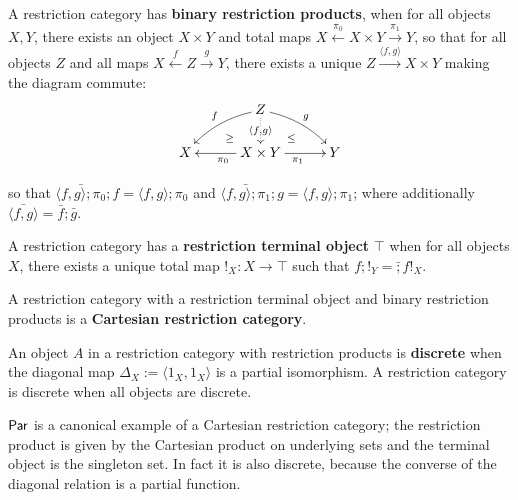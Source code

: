 \begin{definition}
A restriction category has {\bf binary restriction products}, when for all objects  $X,Y$, there exists an object $X\times Y$ and total maps $X \xleftarrow{\pi_0}  X\times Y \xrightarrow{\pi_1} Y$, so that for all objects $Z$ and all maps $X \xleftarrow{f} Z \xrightarrow{g} Y$, there exists a unique $Z\xrightarrow{\langle f,g \rangle} X\times Y$ making the diagram commute:
$$
\xymatrixrowsep{0.2cm}
\xymatrixcolsep{0.4cm}
\xymatrix{
&& Z\ar@{..>}[dd]|-{\langle f, g\rangle} \ar@/_/[ddll]_f \ar@/^/[ddrr]^g &&\\
& \ar@{}[dr]|-{\geq} && \ar@{}[dl] |-{\leq} &\\
X &&  X\times Y \ar[rr]_{\pi_1} \ar[ll]^{\pi_0}  && Y
}
$$

so that $\bar{\langle f, g\rangle ;\pi_0}; f = \langle f, g\rangle ;\pi_0$ and $\bar{\langle f, g\rangle; \pi_1} ;g = \langle f, g\rangle; \pi_1$;
where additionally $\bar{\langle f, g\rangle} =  \bar f ; \bar g$.


A restriction category has a {\bf restriction terminal object} $\top$ when for all objects $X$, there exists a unique total map $!_X:X\to\top$ such that $f ; !_Y = \bar ;  f !_X$.

A restriction category with a restriction terminal object and binary restriction products is a {\bf Cartesian restriction category}.


An object $A$ in a restriction category with restriction products is {\bf discrete} when the diagonal map $\Delta_X:=\langle 1_X, 1_X\rangle$ is a partial isomorphism. A restriction category is discrete when all objects are discrete. 
\end{definition}



$\mathsf{Par}$ is a canonical example of a Cartesian restriction category; the restriction product is given by the Cartesian product on underlying sets and the terminal object is  the singleton set. In fact it is also discrete, because the converse of the diagonal relation is a partial function.




